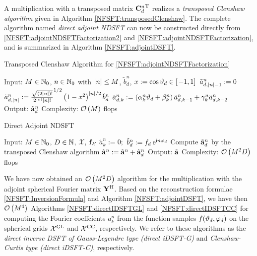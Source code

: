 A multiplication with a transposed matrix ${\mathbf{C}^{n}_{d}}^{\text{\rm{T}}}$ realizes a 
\emph{transposed Clenshaw algorithm} given in Algorithm \ref{NFSFT:transposedClenshaw}. 
The complete algorithm named \emph{direct adjoint NDSFT} can now be constructed directly from \eqref{NFSFT:adjointNDSFTFactorization2} and 
\eqref{NFSFT:adjointNDSFTFactorization}, and is summarized in Algorithm \ref{NFSFT:adjointDSFT}.
\begin{algorithm}[tb]
  \caption{Transposed Clenshaw Algorithm for \eqref{NFSFT:adjointNDSFTFactorization}}
  \label{NFSFT:transposedClenshaw}    
  \begin{algorithmic}
    \STATE  Input: $M \in \mathbb{N}_{0}$, $n \in \mathbb{N}_{0}$ with $\left\vert n\right\vert \le M$, $\tilde{b}^n_{d}$, $x := \cos\vartheta_{d} \in \left[\left.-1,1\right]\right.$
    \STATE
    \STATE $\tilde{a}_{d,\left\vert n\right\vert-1}^n := 0$
    \STATE $\tilde{a}_{d,\left\vert n\right\vert}^n := \frac{\sqrt{(2|n|)!}}{2^{|n|} |n|!}^{1/2} \left(1-x^2\right)^{|n|/2} \tilde{b}^n_{d}$
      \STATE $\tilde{a}_{d,k}^n := \left(\alpha_{k}^n\vartheta_{d} + \beta_{k}^n\right)\tilde{a}_{d,k-1}^n + \gamma_{k}^n \tilde{a}_{d,k-2}^n$
    \ENDFOR
    \STATE
    \STATE Output: $\mathbf{\tilde{a}}^n_{d}$
    \STATE Complexity: $\mathcal{O}\left(M\right)$ flops
\end{algorithmic}
\end{algorithm}
\begin{algorithm}[tb]
  \caption{Direct Adjoint NDSFT}
  \label{NFSFT:adjointDSFT}    
  \begin{algorithmic}
    \STATE  Input: $M \in \mathbb{N}_{0}$, $D \in \mathbb{N}$, $\mathcal{X}$, $\mathbf{f}_{\mathcal{X}}$
    \STATE
        \STATE $\tilde{a}_{k}^n := 0;$
      \ENDFOR
    \ENDFOR
        \STATE $\tilde{b}^n_{d} := f_{d} \: \mbox{\rm{e}}^{\mbox{\scriptsize\rm{i}} n \varphi_{d}}$
        \STATE Compute $\mathbf{\tilde{a}}^n_{d}$ by the transposed Clenshaw algorithm
        \STATE $\mathbf{\tilde{a}}^n := \mathbf{\tilde{a}}^n + \mathbf{\tilde{a}}^n_{d}$
      \ENDFOR
    \ENDFOR
    \STATE
    \STATE Output: $\mathbf{\tilde{a}}$
    \STATE Complexity: $\mathcal{O}\left(M^2 D\right)$ flops
\end{algorithmic}
\end{algorithm}

We have now obtained an $\mathcal{O}\left(M^2 D\right)$ algorithm for the multiplication with the adjoint
spherical Fourier matrix $\mathbf{Y}^{\text{\rm{H}}}$. 
Based on the reconstruction formulae \eqref{NFSFT:InversionFormula} and Algorithm 
\ref{NFSFT:adjointDSFT}, we have then $\mathcal{O}\left(M^4\right)$ Algorithms \ref{NFSFT:directIDSFTGL} 
and \ref{NFSFT:directIDSFTCC} for computing the Fourier coeffcients $a_{k}^n$ from 
the function samples $f{\hspace{-0.4ex}}\left(\vartheta_{d},\varphi_{d}\right)$ on the spherical grids 
$\mathcal{X}^{\mbox{\scriptsize\rm{GL}}}$ and $\mathcal{X}^{\mbox{\scriptsize\rm{CC}}}$, respectively. We refer to these algorithms as the 
\emph{direct inverse DSFT of Gauss-Legendre type (direct iDSFT-G)} and \emph{Clenshaw-Curtis type (direct iDSFT-C)}, respectively.

